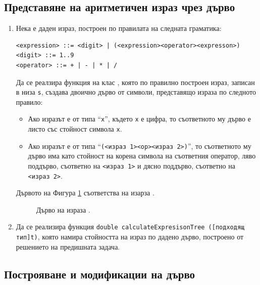 \subsection {Представяне на аритметичен израз чрез дърво}
\begin{enumerate}[resume]
\item Нека е даден израз, построен по правилата на следната граматика:

\begin{verbatim}
<expression> ::= <digit> | (<expression><operator><expresson>)
<digit> ::= 1..9
<operator> ::= + | - | * | /
\end{verbatim}

Да се реалзира функция на клас , която по правилно построен израз, записан в низа \texttt{s}, създава двоично дърво от символи, представящо израза по следното правило:
\begin{itemize}
  \item Ако изразът е от типа ``\texttt{x}'', където \texttt{x} е цифра, то съответното му дърво е листо със стойност символа \texttt{x}.
  \item Ако изразът е от типа ``\texttt{(<израз 1><op><израз 2>)}'', то съответното му дърво има като стойност на корена символа на съответния оператор, ляво поддърво, съответно на \texttt{<израз 1>} и дясно поддърво, съответно на \texttt{<израз 2>}.
\end{itemize}

Дървото на Фигура \ref{fig:treeexpr} съответства на изарза .

\begin{figure}
\centering
{}
\caption{Дърво на израза .}
\label{fig:treeexpr}
\end{figure}

\item Да се реализира функция \texttt{double calculateExpresisonTree ([подходящ тип]t)}, която намира стойността на израз по дадено дърво, построено от решението на предишната задача.

\end{enumerate}

\subsection {Построяване и модификации на дърво}

